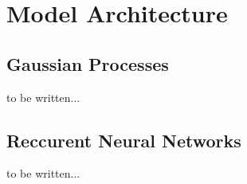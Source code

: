 \section{Model Architecture}
\subsection{Gaussian Processes}
to be written...
\subsection{Reccurent Neural Networks}
to be written...